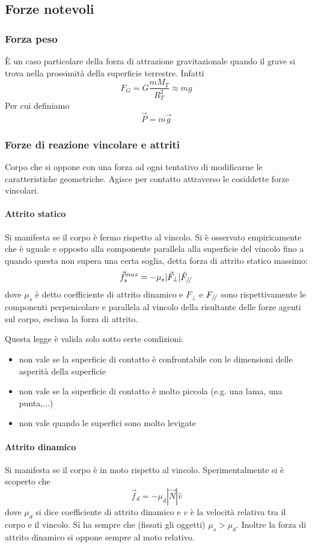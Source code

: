\documentclass{article}
\theoremstyle{plain}
\begin{document}
\subsection{Forze notevoli}
\subsubsection{Forza peso}
È un caso particolare della forza di attrazione gravitazionale quando il grave si trova nella prossimità della superficie terrestre. Infatti
\[F_G=G\frac{mM_T}{R_T^2}\approx m g\]
Per cui definiamo 
\[\vec P=m\vec g\]
\subsubsection{Forze di reazione vincolare e attriti}
\begin{boxdef}[Vincolo]
    Corpo che si oppone con una forza ad ogni tentativo di modificarne le caratteristiche geometriche. Agisce per contatto attraverso le cosiddette forze vincolari.
\end{boxdef}
\paragraph{Attrito statico} Si manifesta se il corpo è fermo rispetto al vincolo. Si è osservato empiricamente che è uguale e opposto alla componente parallela alla superficie del vincolo fino a quando questa non supera una certa soglia, detta forza di attrito statico massimo:
\[\vec f_{s}^{max}=-\mu_s|\vec F_\perp|\hat F_{/\!/}\]
dove $\mu_s$ è detto coefficiente di attrito dinamico e $F_{\perp}$ e $F_{/\!/}$ sono rispettivamente le componenti perpenicolare e parallela al vincolo della risultante delle forze agenti sul corpo, esclusa la forza di attrito.

Questa legge è valida solo sotto certe condizioni:
\begin{itemize}
    \item non vale se la superficie di contatto è confrontabile con le dimensioni delle asperità della superficie
    \item non vale se la superficie di contatto è molto piccola (e.g. una lama, una punta,...)
    \item non vale quando le superfici sono molto levigate
\end{itemize}
\paragraph{Attrito dinamico} Si manifesta se il corpo è in moto rispetto al vincolo. Sperimentalmente si è scoperto che 
\[\vec f_d=-\mu_d|\vec N|\hat v\]
dove $\mu_d$ si dice coefficiente di attrito dinamico e $v$ è la velocità relativa tra il corpo e il vincolo. Si ha sempre che (fissati gli oggetti) $\mu_s >\mu_d$. Inoltre la forza di attrito dinamico si oppone sempre al moto relativo.
\end{document}

